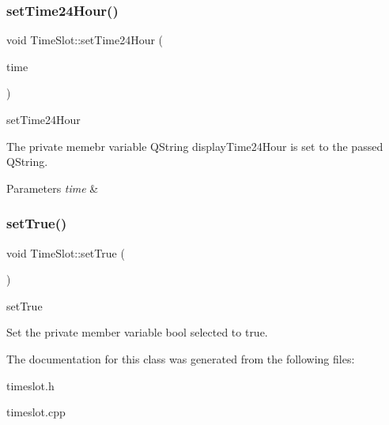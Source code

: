 \subsubsection{\texorpdfstring{set\+Time24\+Hour()}{setTime24Hour()}}
{\footnotesize\ttfamily void Time\+Slot\+::set\+Time24\+Hour (\begin{DoxyParamCaption}\item[{Q\+String}]{time }\end{DoxyParamCaption})}



set\+Time24\+Hour 

The private memebr variable Q\+String display\+Time24\+Hour is set to the passed Q\+String. 
\begin{DoxyParams}{Parameters}
{\em time} & \\
\hline
\end{DoxyParams}
\mbox{\label{class_time_slot_aa063569ec2bc23d252a6eacab8f183fc}} 
\subsubsection{\texorpdfstring{set\+True()}{setTrue()}}
{\footnotesize\ttfamily void Time\+Slot\+::set\+True (\begin{DoxyParamCaption}{ }\end{DoxyParamCaption})}



set\+True 

Set the private member variable bool selected to true. 

The documentation for this class was generated from the following files\+:\begin{DoxyCompactItemize}
\item 
timeslot.\+h\item 
timeslot.\+cpp\end{DoxyCompactItemize}
